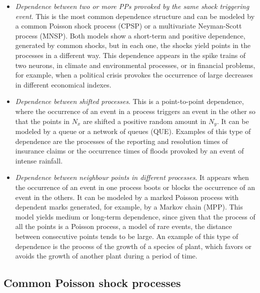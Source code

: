 \begin{itemize}
	
	
	\item[\textbullet] \textit{Dependence between two or more PPs provoked by  the same shock  triggering event}.  This  is   the most common dependence structure and can be modeled  by  a common Poisson shock process (CPSP) or  a multivariate Neyman-Scott process (MNSP).  Both models  show a short-term  and positive dependence, generated by  common shocks, but  in each one, the shocks  yield points in the processes  in a different way.	 This dependence appears in the spike trains of two neurons,  in climate and environmental processes,  or in financial problems,  for example,  when a political crisis provokes the occurrence of  large decreases in   different economical indexes.
	
	
	\item[\textbullet]  \textit{Dependence between shifted processes}. This is  a   point-to-point dependence, where the occurrence of an event in a process triggers an event in  the other so that the points in  $N_x$ are shifted  a positive random amount  in $N_y$.    It  can be modeled by a queue or  a network of   queues (QUE).  Examples of this type of dependence are  the processes of the  reporting and resolution times of insurance claims or the occurrence times of floods provoked by an event of intense rainfall. 
	
	\item[\textbullet]\textit{Dependence  between neighbour  points in different processes}. It  appears when the occurrence of an event in one process boots or blocks the occurrence of an event in the others. It can be modeled by  a marked Poisson process with  dependent marks generated, for example, by a Markov chain (MPP).  This model yields medium or long-term dependence, since  given that the   process of all the points is a Poisson process,  a  model of rare events, the distance  between   consecutive points  tends to be large. An example of this type of dependence  is the process of the growth of a species of plant, which favors or avoids the growth of another plant during a period of time. 
	
	
\end{itemize}




\subsection{Common Poisson shock processes}

